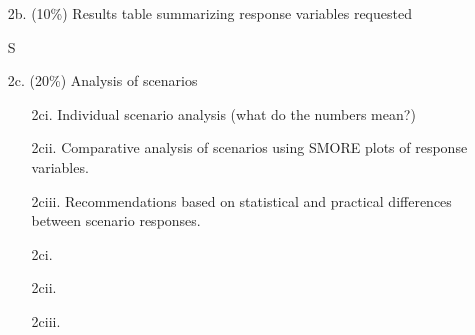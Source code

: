 \documentclass[answers]{exam}
\begin{document}
\begin{questions}
\begin{enumerate}
\begin{solution}
\begin{enumerate}
			\item[2aii.] 
			\item[2aiii.] 
			\item[2aiv.]  
			\item[2av.] 
		\end{enumerate}
	\end{solution}
	\item[2b.] (10\%) Results table summarizing response variables requested
	\begin{solution}
		S
	\end{solution}
	\item[2c.] (20\%) Analysis of scenarios
	\begin{enumerate}
		\item[2ci.] Individual scenario analysis (what do the numbers mean?)
		\item[2cii.] Comparative analysis of scenarios using SMORE plots of response variables.
		\item[2ciii.] Recommendations based on statistical and practical differences between scenario responses. 
	\end{enumerate}
	\begin{solution}
		\begin{enumerate}
			\item[2ci.] 
			\item[2cii.] 
			\item[2ciii.] 
		\end{enumerate}
	\end{solution}
\end{enumerate}


\end{questions}
\end{document}
